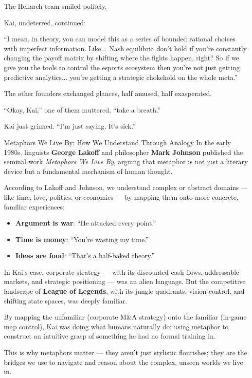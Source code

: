 The Heliarch team smiled politely.

Kai, undeterred, continued:

“I mean, in theory, you can model this as a series of bounded rational choices with imperfect information. 
Like... Nash equilibria don’t hold if you’re constantly changing the payoff matrix by shifting where the 
fights happen, right? So if we give you the tools to control the esports ecosystem then you’re not just 
getting predictive analytics... you’re getting a strategic chokehold on the whole meta.”

The other founders exchanged glances, half amused, half exasperated.

“Okay, Kai,” one of them muttered, “take a breath.”

Kai just grinned.  “I’m just saying. It’s sick.”

\medskip

\begin{HistoricalSidebar}{Metaphors We Live By: How We Understand Through Analogy}
In the early 1980s, linguists \textbf{George Lakoff} and philosopher \textbf{Mark Johnson} published the seminal work \textit{Metaphors We Live By}, arguing that metaphor is not just a literary device but a fundamental mechanism of human thought.

\medskip

According to Lakoff and Johnson, we understand complex or abstract domains — like time, love, politics, or economics — by mapping them onto more concrete, familiar experiences:

\medskip

\begin{itemize}
    \item \textbf{Argument is war}: ``He attacked every point.''  
    \item \textbf{Time is money}: ``You're wasting my time.''
    \item \textbf{Ideas are food}: ``That's a half-baked theory.''
\end{itemize}

\medskip

In Kai's case, corporate strategy — with its discounted cash flows, addressable markets, and strategic positioning — was an alien language.  
But the competitive landscape of \textbf{League of Legends}, with its jungle quadrants, vision control, and shifting state spaces, was deeply familiar.

\medskip

By mapping the unfamiliar (corporate M\&A strategy) onto the familiar (in-game map control), Kai was doing what humans naturally do:  
using metaphor to construct an intuitive grasp of something he had no formal training in.

\medskip

This is why metaphors matter — they aren't just stylistic flourishes; they are the bridges we use to navigate and reason about the complex, unseen worlds we live in.
\end{HistoricalSidebar}
    
